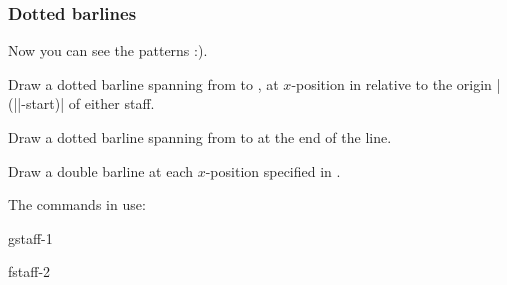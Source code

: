 \subsubsection{Dotted barlines}\label{sec:multistaff:barlines:dotted}
Now you can see the patterns :).
\begin{command}{\tmdottedbarline{}}
  Draw a dotted barline spanning from  to 
  , at $x$-position  in relative to 
  the origin |(||-start)| of either staff.
\end{command}
\begin{command}{\tmdottedbarlineendline{}}
  Draw a dotted barline spanning from  to 
   at the end of the line.
\end{command}
\begin{command}{\tmdottedbarlineinline{}}
  Draw a double barline at each $x$-position specified in .
\end{command}
The commands in use:
\begin{codeexample}[]
\begin{tmline}%
\begin{tmstaff}{g}{staff-1}\end{tmstaff}%
\begin{tmstaff}{f}{staff-2}
\end{tmstaff}%
%
%
%
%
\end{tmline}
\end{codeexample}
